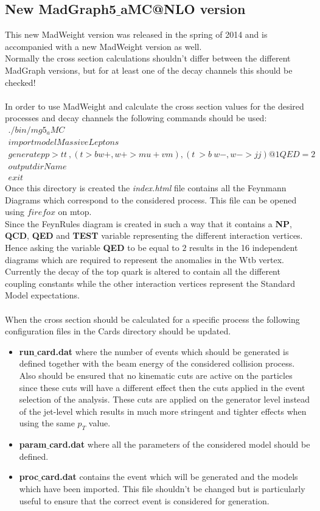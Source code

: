 \documentclass[a4paper,12pt]{report}
\begin{document}
\subsection{New MadGraph5$\_$aMC@NLO version}
This new MadWeight version was released in the spring of 2014 and is accompanied with a new MadWeight version as well.\\
Normally the cross section calculations shouldn't differ between the different MadGraph versions, but for at least one of the decay channels this should be checked!\\
\\
In order to use MadWeight and calculate the cross section values for the desired processes and decay channels the following commands should be used:
\begin{eqnarray}
 ./bin/mg5_aMC \\
 import model MassiveLeptons \\
 generate p p > t t~ , ( t > b w+ , w+ > mu+ vm ) , ( t~ > b~ w- , w- > j j ) @1 QED = 2 \\
 output dirName \\
 exit
\end{eqnarray}
Once this directory is created the \textit{index.html} file contains all the Feynmann Diagrams which correspond to the considered process. This file can be opened using $firefox$ on mtop.\\
Since the FeynRules diagram is created in such a way that it contains a \textbf{NP}, \textbf{QCD}, \textbf{QED} and \textbf{TEST} variable representing the different interaction vertices. Hence asking the variable \textbf{QED} to be equal to $2$ results in the 16 independent diagrams which are required to represent the anomalies in the Wtb vertex. Currently the decay of the top quark is altered to contain all the different coupling constants while the other interaction vertices represent the Standard Model expectations.\\
\\
When the cross section should be calculated for a specific process the following configuration files in the Cards directory should be updated.
\begin{itemize}
 \item \textbf{run$\_$card.dat} where the number of events which should be generated is defined together with the beam energy of the considered collision process. Also should be ensured that no kinematic cuts are active on the particles since these cuts will have a different effect then the cuts applied in the event selection of the analysis. These cuts are applied on the generator level instead of the jet-level which results in much more stringent and tighter effects when using the same $p_{T}$ value.
 \item \textbf{param$\_$card.dat} where all the parameters of the considered model should be defined.
 \item \textbf{proc$\_$card.dat} contains the event which will be generated and the models which have been imported. This file shouldn't be changed but is particularly useful to ensure that the correct event is considered for generation.
\end{itemize}
\end{document}
